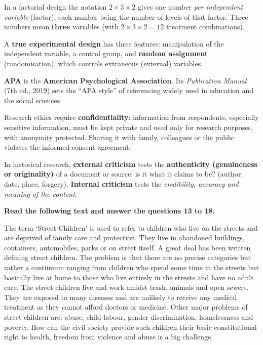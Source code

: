 In a factorial design the notation $2\times3\times2$ gives one number \emph{per independent variable} (factor), each number being the number of levels of that factor. Three numbers mean \textbf{three} variables (with $2\times3\times2=12$ treatment combinations).

A \textbf{true experimental design} has three features: manipulation of the independent variable, a control group, and \textbf{random assignment} (randomisation), which controls extraneous (external) variables.

\textbf{APA} is the \textbf{American Psychological Association}. Its \emph{Publication Manual} (7th ed., 2019) sets the ``APA style'' of referencing widely used in education and the social sciences.

Research ethics require \textbf{confidentiality}: information from respondents, especially sensitive information, must be kept private and used only for research purposes, with anonymity protected. Sharing it with family, colleagues or the public violates the informed-consent agreement.

In historical research, \textbf{external criticism} tests the \textbf{authenticity (genuineness or originality)} of a document or source: is it what it claims to be? (author, date, place, forgery). \textbf{Internal criticism} tests the \emph{credibility, accuracy and meaning of the content}.

\textbf{Read the following text and answer the questions 13 to 18.}\par\smallskip
The term `Street Children' is used to refer to children who live on the streets and are deprived of family care and protection. They live in abandoned buildings, containers, automobiles, parks or on street itself. A great deal has been written defining street children. The problem is that there are no precise categories but rather a continuum ranging from children who spend some time in the streets but basically live at home to those who live entirely in the streets and have no adult care. The street children live and work amidst trash, animals and open sewers. They are exposed to many diseases and are unlikely to receive any medical treatment as they cannot afford doctors or medicine. Other major problems of street children are: abuse, child labour, gender discrimination, homelessness and poverty. How can the civil society provide such children their basic constitutional right to health, freedom from violence and abuse is a big challenge.

